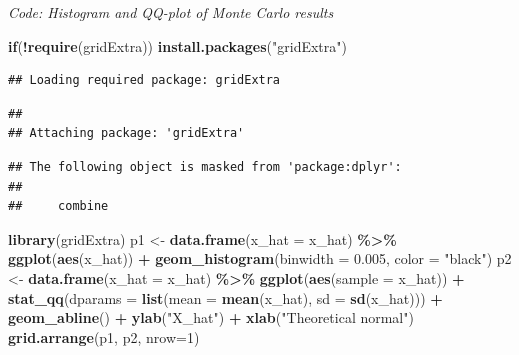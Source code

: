 \documentclass[
]{article}
\newenvironment{Shaded}{\begin{snugshade}}{\end{snugshade}}
\newcommand{\ControlFlowTok}[1]{\textcolor[rgb]{0.13,0.29,0.53}{\textbf{#1}}}
\newcommand{\DataTypeTok}[1]{\textcolor[rgb]{0.13,0.29,0.53}{#1}}
\newcommand{\DecValTok}[1]{\textcolor[rgb]{0.00,0.00,0.81}{#1}}
\newcommand{\FloatTok}[1]{\textcolor[rgb]{0.00,0.00,0.81}{#1}}
\newcommand{\KeywordTok}[1]{\textcolor[rgb]{0.13,0.29,0.53}{\textbf{#1}}}
\newcommand{\NormalTok}[1]{#1}
\newcommand{\OperatorTok}[1]{\textcolor[rgb]{0.81,0.36,0.00}{\textbf{#1}}}
\newcommand{\StringTok}[1]{\textcolor[rgb]{0.31,0.60,0.02}{#1}}
\begin{document}
\emph{Code: Histogram and QQ-plot of Monte Carlo results}

\begin{Shaded}
\begin{Highlighting}[]
\ControlFlowTok{if}\NormalTok{(}\OperatorTok{!}\KeywordTok{require}\NormalTok{(gridExtra)) }\KeywordTok{install.packages}\NormalTok{(}\StringTok{"gridExtra"}\NormalTok{)}
\end{Highlighting}
\end{Shaded}

\begin{verbatim}
## Loading required package: gridExtra
\end{verbatim}

\begin{verbatim}
## 
## Attaching package: 'gridExtra'
\end{verbatim}

\begin{verbatim}
## The following object is masked from 'package:dplyr':
## 
##     combine
\end{verbatim}

\begin{Shaded}
\begin{Highlighting}[]
\KeywordTok{library}\NormalTok{(gridExtra)}
\NormalTok{p1 \textless{}{-}}\StringTok{ }\KeywordTok{data.frame}\NormalTok{(}\DataTypeTok{x\_hat =}\NormalTok{ x\_hat) }\OperatorTok{\%\textgreater{}\%}
\StringTok{    }\KeywordTok{ggplot}\NormalTok{(}\KeywordTok{aes}\NormalTok{(x\_hat)) }\OperatorTok{+}
\StringTok{    }\KeywordTok{geom\_histogram}\NormalTok{(}\DataTypeTok{binwidth =} \FloatTok{0.005}\NormalTok{, }\DataTypeTok{color =} \StringTok{"black"}\NormalTok{)}
\NormalTok{p2 \textless{}{-}}\StringTok{ }\KeywordTok{data.frame}\NormalTok{(}\DataTypeTok{x\_hat =}\NormalTok{ x\_hat) }\OperatorTok{\%\textgreater{}\%}
\StringTok{    }\KeywordTok{ggplot}\NormalTok{(}\KeywordTok{aes}\NormalTok{(}\DataTypeTok{sample =}\NormalTok{ x\_hat)) }\OperatorTok{+}
\StringTok{    }\KeywordTok{stat\_qq}\NormalTok{(}\DataTypeTok{dparams =} \KeywordTok{list}\NormalTok{(}\DataTypeTok{mean =} \KeywordTok{mean}\NormalTok{(x\_hat), }\DataTypeTok{sd =} \KeywordTok{sd}\NormalTok{(x\_hat))) }\OperatorTok{+}
\StringTok{    }\KeywordTok{geom\_abline}\NormalTok{() }\OperatorTok{+}
\StringTok{    }\KeywordTok{ylab}\NormalTok{(}\StringTok{"X\_hat"}\NormalTok{) }\OperatorTok{+}
\StringTok{    }\KeywordTok{xlab}\NormalTok{(}\StringTok{"Theoretical normal"}\NormalTok{)}
\KeywordTok{grid.arrange}\NormalTok{(p1, p2, }\DataTypeTok{nrow=}\DecValTok{1}\NormalTok{)}
\end{Highlighting}
\end{Shaded}
\end{document}
